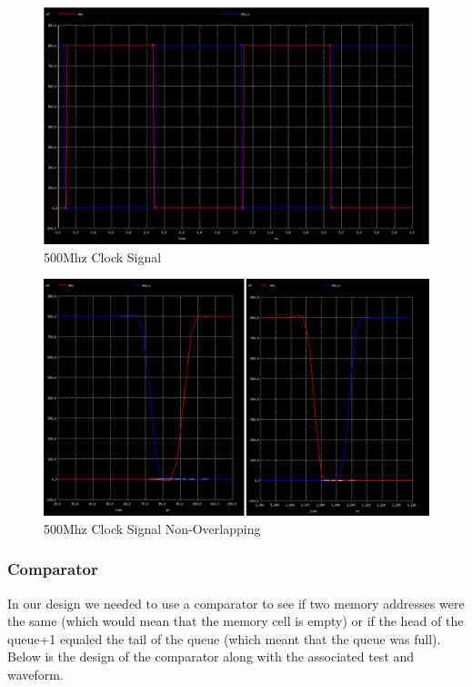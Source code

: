 \documentclass[a4paper]{article}
\begin{document}
\begin{figure}[H]
	\centering
	\includegraphics[scale=0.26]{clockMhz}
	\caption{500Mhz Clock Signal}
	\label{fig:clockMhz}
\end{figure}

\begin{figure}[H]
	\centering
	\includegraphics[scale=0.26]{clockMhzOverlap}
	\caption{500Mhz Clock Signal Non-Overlapping}
	\label{fig:clockMhzOverlap}
\end{figure}


\subsubsection{Comparator}
\label{sec:comparator_design}

In our design we needed to use a comparator to see if two memory addresses were the same (which would mean that the memory cell is empty) or if the head of the queue+1 equaled the tail of the queue (which meant that the queue was full). Below is the design of the comparator along with the associated test and waveform.
\end{document}
